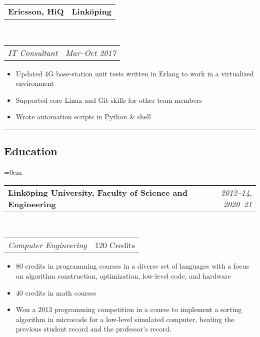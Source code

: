 \documentclass[10pt,letterpaper]{article}
\makeatletter
\newcommand{\headerrow}[2]
{\begin{tabular*}{\linewidth}{l@{\extracolsep{\fill}}r}
    #1 &
    #2 \\
\end{tabular*}}
\makeatother
\begin{document}
\headerrow
{\textbf{Ericsson, HiQ}}
{\textbf{Linköping}}
\\
\headerrow
{\emph{IT Consultant}}
{\emph{Mar--Oct 2017}}
\begin{itemize}[noitemsep, topsep=1pt]
    \item Updated 4G base-station unit tests written in
        Erlang to work in a virtualized environment
    \item Supported core Linux and Git skills for other team members
    \item Wrote automation scripts in Python \& shell
\end{itemize}
\vspace{1em}



\hrule
\vspace{-0.4em}
\subsection*{Education}
\parindent=0em

\headerrow
    {\textbf{Linköping University, Faculty of Science and Engineering}}
    {\emph{2012--14, 2020--21}}
\\
\headerrow
    {\emph{Computer Engineering}}
    {120 Credits}
\begin{itemize}[noitemsep, topsep=1pt]
    \item 80 credits in programming courses in a diverse set of languages with
        a focus on algorithm construction, optimization, low-level code, and
        hardware
    \item 40 credits in math courses
    \item Won a 2013 programming competition in a course to implement a sorting
        algorithm in microcode for a low-level simulated computer, beating the
        previous student record and the professor's record.
\end{itemize}
\vspace{1em}
\end{document}
